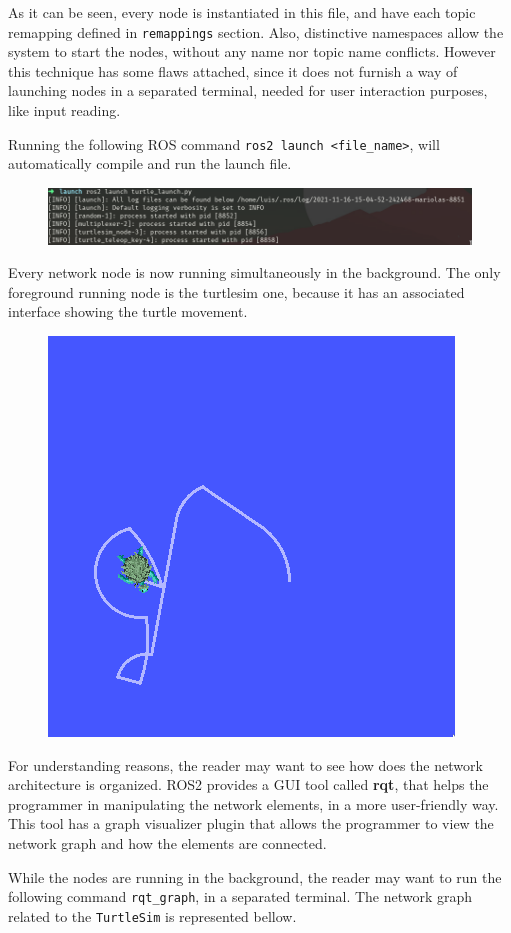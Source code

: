 As it can be seen, every node is instantiated in this file, and have each topic remapping defined in \texttt{remappings} section. Also, distinctive namespaces allow the system to start the nodes, without any name nor topic name conflicts. However this technique has some flaws attached, since it does not furnish a way of launching nodes in a separated terminal, needed for user interaction purposes, like input reading.

Running the following ROS command \texttt{ros2 launch <file\_name>}, will automatically compile and run the launch file.

\begin{figure}[H]
        \centering
         \includegraphics[width=0.7\linewidth]{images/ts_launch_ros.png}
\end{figure}

Every network node is now running simultaneously in the background. The only foreground running node is the turtlesim one, because it has an associated interface showing the turtle movement.

\begin{figure}[H]
        \centering
        \includegraphics[width=0.3\linewidth]{images/ts_turtle.png}
\end{figure}

For understanding reasons, the reader may want to see how does the network architecture is organized. ROS2 provides a GUI tool called \textbf{rqt}, that helps the programmer in manipulating the network elements, in a more user-friendly way. This tool has a graph visualizer plugin that allows the programmer to view the network graph and how the elements are connected.

While the nodes are running in the background, the reader may want to run the following command \texttt{rqt\_graph}, in a separated terminal. The network graph related to the \texttt{TurtleSim} is represented bellow.


